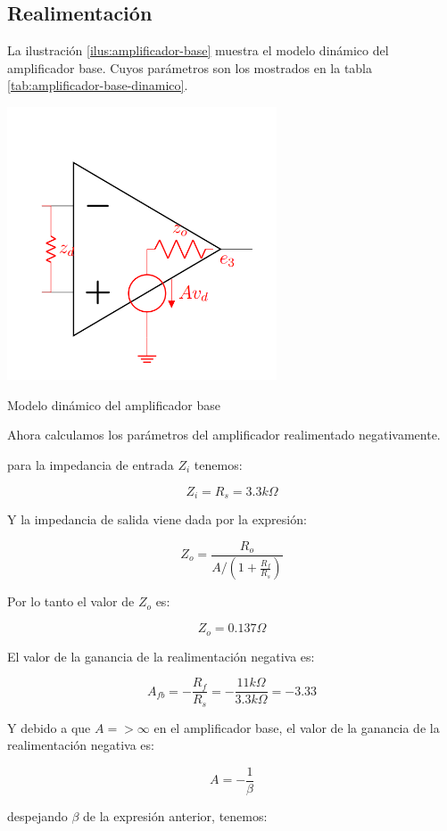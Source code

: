 \subsection{Realimentación}
La ilustración \ref{ilus:amplificador-base} muestra el modelo dinámico del amplificador base. Cuyos parámetros son los mostrados en la tabla \ref{tab:amplificador-base-dinamico}.

\begin{ilustracion}[ht]
    \centering
    \includegraphics[width=0.6\textwidth]{src/images/p5/modelo-amplificador.png}
    \caption{Modelo dinámico del amplificador base}
    \label{ilus:amplificador-base}
\end{ilustracion}
Ahora calculamos los parámetros del amplificador realimentado negativamente.

para la impedancia de entrada $Z_i$ tenemos:

$$Z_i = R_s = 3.3 k\Omega$$

Y la impedancia de salida viene dada por la expresión:

$$Z_o = \frac{R_o}{A / (1 + \frac{R_f}{R_s})}$$

Por lo tanto el valor de $Z_o$ es:

$$Z_o = 0.137 \Omega$$

El valor de la ganancia de la realimentación negativa es: 

$$A_{fb} = - \frac{R_f}{R_s} = - \frac{11k\Omega}{3.3k\Omega} = -3.33$$

Y debido a que $A => \infty$ en el amplificador base, el valor de la ganancia de la realimentación negativa es:

$$A = -\frac{1}{\beta}$$

despejando $\beta$ de la expresión anterior, tenemos:

